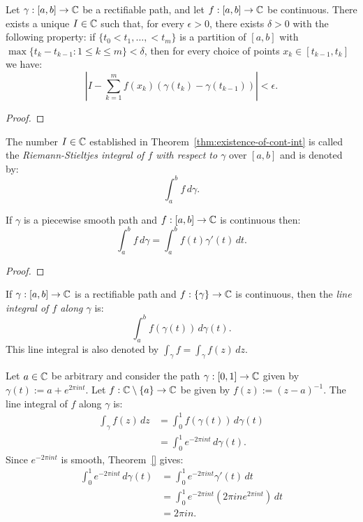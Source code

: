 \begin{theorem}\label{thm:existence-of-cont-int}
	Let $\gamma:[a,b] \rightarrow \mathbb{C}$ be a rectifiable path, and let $f:[a,b] \rightarrow \mathbb{C}$ be continuous. There exists a unique $I \in \mathbb{C}$ such that, for every $\epsilon > 0$, there exists $\delta > 0$ with the following property: if $\{t_0 < t_1,\ldots, <t_m\}$ is a partition of $[a,b]$ with $\max \{t_k - t_{k-1} : 1 \leq k \leq m \} < \delta$, then for every choice of points $x_k \in [t_{k-1},t_k]$ we have:
	\[
		\left| I - \sum_{k = 1}^{m}  f(x_k) \left( \gamma(t_k) - \gamma(t_{k-1}) \right)  \right| < \epsilon.
	\] 
\end{theorem}
{\color{red}
\begin{proof}
		
\end{proof}}

\begin{definition}
	The number $I \in \mathbb{C}$ established in Theorem~\ref{thm:existence-of-cont-int} is called the \emph{Riemann-Stieltjes integral of $f$ with respect to $\gamma$} over $[a,b]$ and is denoted by:
	\[
		\int_{a}^{b} f\,d\gamma.
	\] 
\end{definition}

\begin{theorem}
	If $\gamma$ is a piecewise smooth path and $f:[a,b] \rightarrow \mathbb{C}$ is continuous then:
	\[
		\int_{a}^{b} f\,d \gamma = \int_{a}^{b} f(t) \gamma'(t)\,dt.
	\] 
\end{theorem}
{\color{red}
\begin{proof}
		
\end{proof}}

\begin{definition}
	If $\gamma:[a,b] \rightarrow \mathbb{C}$ is a rectifiable path and $f:\{\gamma\} \rightarrow \mathbb{C}$ is continuous, then the \emph{line integral of $f$ along $\gamma$} is:
	\[
		\int_{a}^{b} f(\gamma(t))\,d\gamma(t).	
	\]
	This line integral is also denoted by $\int_{\gamma}^{} f = \int_{\gamma}^{} f(z)\,dz$.
\end{definition}

\begin{example}
	Let $a \in \mathbb{C}$ be arbitrary and consider the path $\gamma:[0,1] \rightarrow \mathbb{C}$ given by $\gamma(t) := a + e^{2\pi i n t}$. Let $f:\mathbb{C} \setminus \{a\} \rightarrow \mathbb{C}$ be given by $f(z) := (z-a)^{-1}$. The line integral of $f$ along $\gamma$ is:
	\begin{align*}
		\int_{\gamma}^{} f(z)\,dz
		&= \int_{0}^{1} f(\gamma(t))\,d\gamma(t) \\
		&= \int_{0}^{1} e^{-2\pi i n t}\,d\gamma(t).
	\end{align*}
	Since $e^{-2\pi i n t}$ is smooth, Theorem~\ref{} gives:
	\begin{align*}
		\int_{0}^{1} e^{-2 \pi i n t}\,d\gamma(t)
		&= \int_{0}^{1} e^{-2 \pi i n t} \gamma'(t)\,dt \\
		&= \int_{0}^{1} e^{-2 \pi i n t} \left( 2\pi i n e^{2 \pi i  n t} \right)\,dt  \\
		&= 2\pi i n.
	\end{align*}
\end{example}

